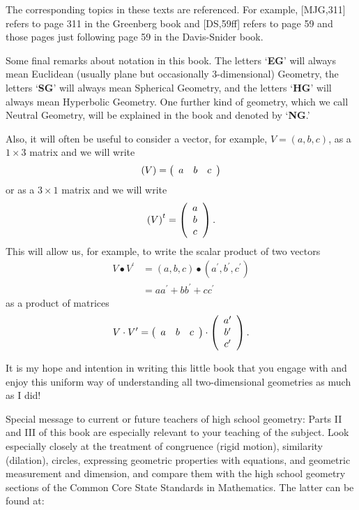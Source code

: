 The corresponding topics in these texts are referenced. For example, [MJG,311]
refers to page 311 in the Greenberg book and [DS,59ff] refers to page 59 and
those pages just following page 59 in the Davis-Snider book.

Some final remarks about notation in this book. The letters `\textbf{EG}' will
always mean Euclidean (usually plane but occasionally $3$-dimensional)
Geometry, the letters `\textbf{SG}' will always mean Spherical Geometry, and
the letters `\textbf{HG}' will always mean Hyperbolic Geometry. One further
kind of geometry, which we call Neutral Geometry, will be explained in the
book and denoted by `\textbf{NG}.'

Also, it will often be useful to consider a vector, for example, $V=\left(
a,b,c\right)  $, as a $1\times3$ matrix and we will write%
\[
\left(  V\right)  =\left(
\begin{array}
[c]{ccc}%
a & b & c
\end{array}
\right)
\]
or as a $3\times1$ matrix and we will write%
\[
\left(  V\right)  ^{t}=\left(
\begin{array}
[c]{c}%
a\\
b\\
c
\end{array}
\right)  .
\]
This will allow us, for example, to write the scalar product of two vectors%
\begin{align*}
V\bullet V^{\prime}  &  =\left(  a,b,c\right)  \bullet\left(  a^{\prime
},b^{\prime},c^{\prime}\right) \\
&  =aa^{\prime}+bb^{\prime}+cc^{\prime}%
\end{align*}
as a product of matrices%
\[
V\cdot V^{\prime}=\left(
\begin{array}
[c]{ccc}%
a & b & c
\end{array}
\right)  \cdot\left(
\begin{array}
[c]{c}%
a^{\prime}\\
b^{\prime}\\
c^{\prime}%
\end{array}
\right)  .
\]


It is my hope and intention in writing this little book that you engage with
and enjoy this uniform way of understanding all two-dimensional geometries as
much as I did!

\begin{remark}
Special message to current or future teachers of high school geometry: Parts
II and III of this book are especially relevant to your teaching of the
subject. Look especially closely at the treatment of congruence (rigid
motion), similarity (dilation), circles, expressing geometric properties with
equations, and geometric measurement and dimension, and compare them with the
high school geometry sections of the Common Core State Standards in
Mathematics. The latter can be found at:
\end{remark}

